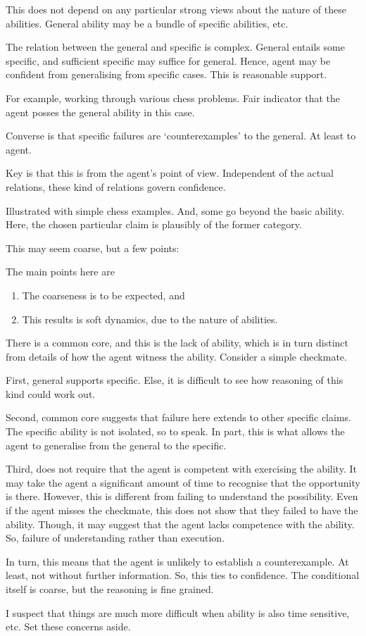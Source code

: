 \documentclass[10pt]{article}
\begin{document}
\begin{note}
This does not depend on any particular strong views about the nature of these abilities.
General ability may be a bundle of specific abilities, etc.

The relation between the general and specific is complex.
General entails some specific, and sufficient specific may suffice for general.
Hence, agent may be confident from generalising from specific cases.
This is reasonable support.

For example, working through various chess problems.
Fair indicator that the agent posses the general ability in this case.

Converse is that specific failures are `counterexamples' to the general.
At least to agent.

Key is that this is from the agent's point of view.
Independent of the actual relations, these kind of relations govern confidence.

Illustrated with simple chess examples.
And, some go beyond the basic ability.
Here, the chosen particular claim is plausibly of the former category.

This may seem coarse, but a few points:

The main points here are
\begin{enumerate}
\item The coarseness is to be expected, and
\item This results is soft dynamics, due to the nature of abilities.
\end{enumerate}

There is a common core, and this is the lack of ability, which is in turn distinct from details of how the agent witness the ability.
Consider a simple checkmate.

First, general supports specific.
Else, it is difficult to see how reasoning of this kind could work out.

Second, common core suggests that failure here extends to other specific claims.
The specific ability is not isolated, so to speak.
In part, this is what allows the agent to generalise from the general to the specific.

Third, does not require that the agent is competent with exercising the ability.
It may take the agent a significant amount of time to recognise that the opportunity is there.
However, this is different from failing to understand the possibility.
Even if the agent misses the checkmate, this does not show that they failed to have the ability.
Though, it may suggest that the agent lacks competence with the ability.
So, failure of understanding rather than execution.


In turn, this means that the agent is unlikely to establish a counterexample.
At least, not without further information.
So, this ties to confidence.
The conditional itself is coarse, but the reasoning is fine grained.

I suspect that things are much more difficult when ability is also time sensitive, etc.
Set these concerns aside.
\end{note}
\end{document}
